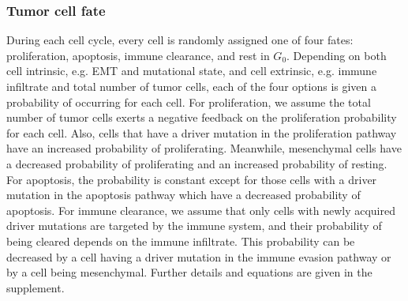 \documentclass[11pt]{article}
\begin{document}
\subsubsection{Tumor cell fate}
During each cell cycle, every cell is randomly assigned one of four fates: proliferation, apoptosis, immune clearance, and rest in $G_0$.
Depending on both cell intrinsic, e.g. EMT and mutational state, and cell extrinsic, e.g. immune infiltrate and total number of tumor cells, each of the four options is given a probability of occurring for each cell.
For proliferation, we assume the total number of tumor cells exerts a negative feedback on the proliferation probability for each cell.
Also, cells that have a driver mutation in the proliferation pathway have an increased probability of proliferating.
Meanwhile, mesenchymal cells have a decreased probability of proliferating and an increased probability of resting.
For apoptosis, the probability is constant except for those cells with a driver mutation in the apoptosis pathway which have a decreased probability of apoptosis.
For immune clearance, we assume that only cells with newly acquired driver mutations are targeted by the immune system, and their probability of being cleared depends on the immune infiltrate.
This probability can be decreased by a cell having a driver mutation in the immune evasion pathway or by a cell being mesenchymal.
Further details and equations are given in the supplement.
\end{document}
